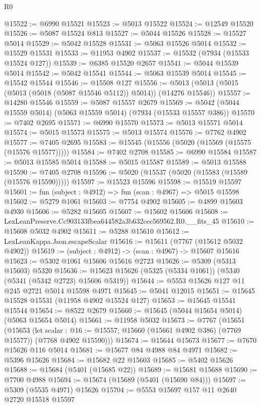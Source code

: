 \begin{lexlean}{R0}
\begin{coremodule}
@15522 := @6990 @15521
@15523 := @5013 @15522
@15524 := @12549 @15520
@15526 := @5087 @15524 @813
@15527 := @5044 @15526
@15528 := @15527 @5014
@15529 := @5042 @15528
@15531 := @5063 @15526 @5014
@15532 := @15529 @15531
@15533 := @11953 @4902
@15537 := @15532 (@7934 (@15533 @15524 @127))
@15539 := @6385 @15520 @2657
@15541 := @5044 @15539 @5014
@15542 := @5042 @15541
@15544 := @5063 @15539 @5014
@15545 := @15542 @15544
@15546 := @15508 @127
@15556 := @5013 (@5013 (@5015 (@5013 (@5018 (@5087 @15546 @5112)) @5014)) (@14276 @15546))
@15557 := @14280 @15546
@15559 := @5087 @15557 @2679
@15569 := @5042 (@5044 @15559 @5014) (@5063 @15559 @5014) (@7934 (@15533 @15557 @386))
@15570 := @7402 @2695
@15571 := @6990 @15570
@15573 := @5013 @15571 @5014
@15574 := @5015 @15573
@15575 := @5013 @15574
@15576 := @7762 @4902
@15577 := @7405 @2695
@15583 := @15545 (@15556 (@5020 (@15569 (@15575 (@15576 @15577)))))
@15584 := @7402 @2708
@15585 := @6990 @15584
@15587 := @5013 @15585 @5014
@15588 := @5015 @15587
@15589 := @5013 @15588
@15590 := @7405 @2708
@15596 := @5020 (@15537 (@5020 (@15583 (@15589 (@15576 @15590)))))
@15597 := @15523 @15596
@15598 := @15519 @15597
@15601 := fun (subject : @4912) => fun (scan : @4967) => @5015 @15598
@15602 := @5279 @1061
@15603 := @7754 @4902
@15605 := @4899 @15603 @4930
@15606 := @5282 @15605
@15607 := @15602 @15606
@15608 := LexLeanPreserve.Cc903133fbea644582a3b632cec569562.R0.__fits_45
@15610 := @15608 @5032 @4902
@15611 := @5288 @15610
@15612 := LexLeanKappa.Json.escapeScalar
@15616 := @15611 (@7767 (@15612 @5032 @4902))
@15619 := (subject : @4912) -> (scan : @4967) -> @15607 @15616
@15623 := @5302 @1061 @15606 @15616 @2723
@15626 := @5309 (@5313 @15603) @5320
@15636 := @15623 @15626 (@5325 (@5334 @1061)) (@5340 (@5341 (@5342 @2723) @15606 @5319))
@15644 := @5553 @15626 @127 @11 @245 @2721 @5014 @15598 @4971
@15645 := @5041 @12015
@15651 := @15645 @15528 @15531 (@11958 @4902 @15524 @127)
@15653 := @15645 @15541 @15544
@15654 := @8522 @2679
@15660 := @15645 (@5044 @15654 @5014) (@5063 @15654 @5014)
@15661 := @11958 @5032
@15673 := @7767
    (@15651
      (@15653
        (let scalar : @16 := @15557; @15660 (@15661 @4902 @386) (@7769 @15577))
        (@7768 @4902 @15590)))
@15674 := @15644 @15673
@15677 := @7670 @15626 @116 @5014
@15681 := @15677 @84 @4988 @84 @4971
@15682 := @5396 @15626
@15684 := @15682 @22 @15603
@15685 := @5402 @15626
@15688 := @15684 (@5401 (@15685 @22))
@15689 := @15681 @15688
@15690 := @7700 @4988
@15694 := @15674 (@15689 (@5401 (@15690 @84)))
@15697 := @5309 (@5535 @4971) @15626
@15704 := @5553 @15697 @157 @11 @2640 @2720 @15518 @15597

\end{coremodule}
\end{lexlean}
